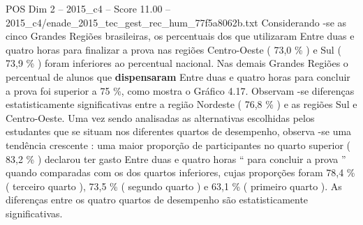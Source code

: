\begin{textsample}{POS Dim 2 – 2015\_c4 – Score 11.00 – 2015\_c4/enade\_2015\_tec\_gest\_rec\_hum\_77f5a8062b.txt}
Considerando -se as cinco Grandes Regiões brasileiras, os percentuais dos que utilizaram Entre duas e quatro horas para finalizar a prova nas regiões Centro-Oeste ( 73,0 \% ) e Sul ( 73,9 \% ) foram inferiores ao percentual nacional.
Nas demais Grandes Regiões o percentual de alunos que \textbf{dispensaram} Entre duas e quatro horas para concluir a prova foi superior a 75 \%, como mostra o Gráfico 4.17.
Observam -se diferenças estatisticamente significativas entre a região Nordeste ( 76,8 \% ) e as regiões Sul e Centro-Oeste.
Uma vez sendo analisadas as alternativas escolhidas pelos estudantes que se situam nos diferentes quartos de desempenho, observa -se uma tendência crescente : uma maior proporção de participantes no quarto superior ( 83,2 \% ) declarou ter gasto Entre duas e quatro horas “ para concluir a prova ” quando comparadas com os dos quartos inferiores, cujas proporções foram 78,4 \% ( terceiro quarto ), 73,5 \% ( segundo quarto ) e 63,1 \% ( primeiro quarto ).
As diferenças entre os quatro quartos de desempenho são estatisticamente significativas.

\end{textsample}
